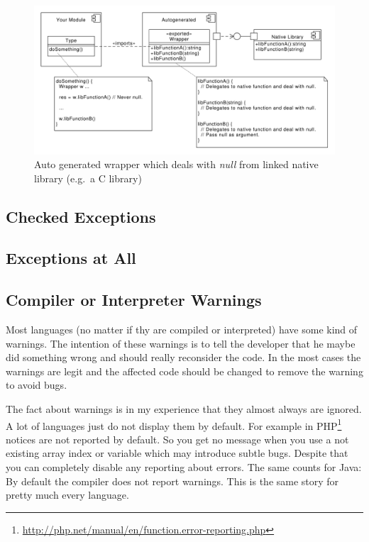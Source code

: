 \documentclass[11pt, a4paper]{report}
\begin{document}
\begin{figure}[ht]
    \centering
    \includegraphics[width=350pt]{grafics/Generated_wrapper_for_linked_native_libs.pdf}
    \caption{Auto generated wrapper which deals with \textit{null} from linked native library (e.g.\ a C library)}
    \label{fig:Generated_wrapper_for_linked_native_libs}
\end{figure}

\subsection{Checked Exceptions}


\subsection{Exceptions at All}


\subsection{Compiler or Interpreter Warnings}

Most languages (no matter if thy are compiled or interpreted) have some kind of warnings. The intention of these warnings is to tell the developer that he maybe did something wrong and should really reconsider the code. In the most cases the warnings are legit and the affected code should be changed to remove the warning to avoid bugs.

The fact about warnings is in my experience that they almost always are ignored. A lot of languages just do not display them by default. For example in PHP\footnote{\url{http://php.net/manual/en/function.error-reporting.php}} notices are not reported by default. So you get no message when you use a not existing array index or variable which may introduce subtle bugs. Despite that you can completely disable any reporting about errors. The same counts for Java: By default the compiler does not report warnings. This is the same story for pretty much every language. 
\end{document}
